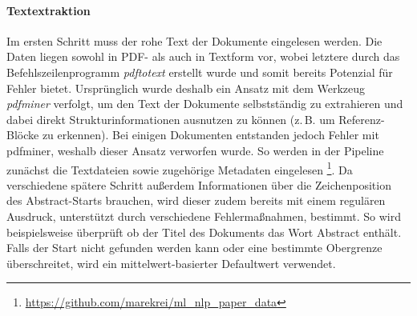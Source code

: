 \documentclass[bachelor,german]{info1thesis}
\begin{document}
\paragraph{Textextraktion} Im ersten Schritt muss der rohe Text der Dokumente eingelesen werden. Die Daten liegen sowohl in PDF- als auch in Textform vor, wobei letztere durch das Befehlszeilenprogramm \textit{pdftotext} erstellt wurde und somit bereits Potenzial für Fehler bietet. Ursprünglich wurde deshalb ein Ansatz mit dem Werkzeug \textit{pdfminer} verfolgt, um den Text der Dokumente selbstständig zu extrahieren und dabei direkt Strukturinformationen ausnutzen zu können (z.\,B. um Referenz-Blöcke zu erkennen). Bei einigen Dokumenten entstanden jedoch Fehler mit pdfminer, weshalb dieser Ansatz verworfen wurde. So werden in der Pipeline zunächst die Textdateien sowie zugehörige Metadaten eingelesen \footnote{\url{https://github.com/marekrei/ml_nlp_paper_data}}. Da verschiedene spätere Schritt außerdem Informationen über die Zeichenposition des Abstract-Starts brauchen, wird dieser zudem bereits mit einem regulären Ausdruck, unterstützt durch verschiedene Fehlermaßnahmen, bestimmt. So wird beispielsweise überprüft ob der Titel des Dokuments das Wort Abstract enthält. Falls der Start nicht gefunden werden kann oder eine bestimmte Obergrenze überschreitet, wird ein mittelwert-basierter Defaultwert verwendet.
\end{document}
